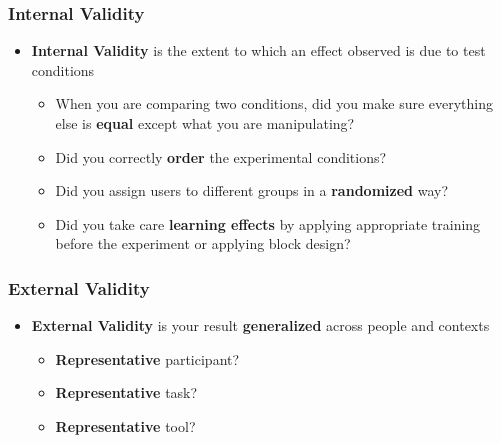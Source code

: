 \documentclass{beamer}
\begin{document}

\begin{frame}
\frametitle{Internal Validity}
\begin{itemize}
	\item \textbf{Internal Validity} is the extent to which an effect observed is due to test conditions
	\begin{itemize}
		\item When you are comparing two conditions, did you make sure everything else is \textbf{equal} except what you are manipulating?
		\item Did you correctly \textbf{order} the experimental conditions?
		\item Did you assign users to different groups in a \textbf{randomized} way?
		\item Did you take care \textbf{learning effects} by applying appropriate training before the experiment or applying block design?
	\end{itemize}
\end{itemize}
\end{frame}

\begin{frame}
\frametitle{External Validity}
\begin{itemize}
\item \textbf{External Validity} is your result \textbf{generalized} across people and contexts
\begin{itemize}
	\item \textbf{Representative} participant? %
	\item \textbf{Representative} task? %
	\item \textbf{Representative} tool? %
\end{itemize}
\end{itemize}
\end{frame}
\end{document}
